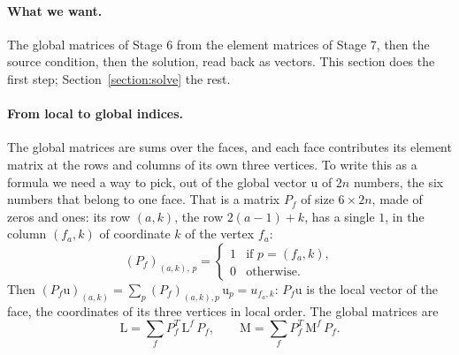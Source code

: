 \paragraph{What we want.} The global matrices of Stage 6 from the element matrices of Stage 7, then the source condition, then the solution, read back as vectors. This section does the first step; Section~\ref{section:solve} the rest.

\paragraph{From local to global indices.} The global matrices are sums over the faces, and each face contributes its element matrix at the rows and columns of its own three vertices. To write this as a formula we need a way to pick, out of the global vector $\mathrm u$ of $2n$ numbers, the six numbers that belong to one face. That is a matrix $P_f$ of size $6 \times 2n$, made of zeros and ones: its row $(a, k)$, the row $2(a-1) + k$, has a single $1$, in the column $(f_a, k)$ of coordinate $k$ of the vertex $f_a$:
\begin{equation*}
(P_f)_{(a,k),\,p} = \begin{cases} 1 & \text{if } p = (f_a, k), \\ 0 & \text{otherwise.}\end{cases}
\end{equation*}
Then $(P_f\mathrm u)_{(a,k)} = \sum_p (P_f)_{(a,k),p}\, \mathrm u_p = u_{f_a,k}$: $P_f\mathrm u$ is the local vector of the face, the coordinates of its three vertices in local order. The global matrices are
\begin{equation}
\label{eqn:assembly}
\mathrm L = \sum_f P_f^T\, \mathrm L^f\, P_f, \qquad \mathrm M = \sum_f P_f^T\, \mathrm M^f\, P_f .
\end{equation}

